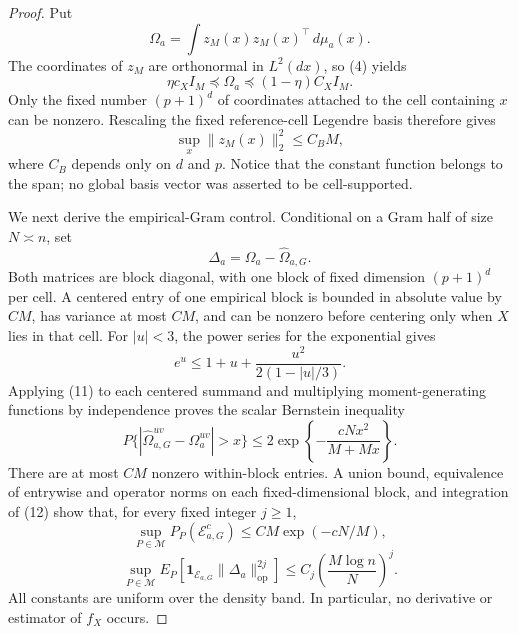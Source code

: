 \documentclass{article}
\begin{document}
\begin{proof}
Put
\[
 \Omega_a=\int z_M(x)z_M(x)^\top\,d\mu_a(x).
 \tag{8}
\]
The coordinates of \(z_M\) are orthonormal in \(L^2(dx)\), so (4) yields
\[
 \eta c_X I_M\preceq\Omega_a
 \preceq(1-\eta)C_XI_M.
 \tag{9}
\]
Only the fixed number \((p+1)^d\) of coordinates attached to the cell containing \(x\) can be nonzero.  Rescaling the fixed reference-cell Legendre basis therefore gives
\[
 \sup_x\|z_M(x)\|_2^2\leq C_BM,
 \tag{10}
\]
where \(C_B\) depends only on \(d\) and \(p\).  Notice that the constant function belongs to the span; no global basis vector was asserted to be cell-supported.

We next derive the empirical-Gram control.  Conditional on a Gram half of size \(N\asymp n\), set
\[
 \Delta_a=\Omega_a-\widehat\Omega_{a,G}.
\]
Both matrices are block diagonal, with one block of fixed dimension \((p+1)^d\) per cell.  A centered entry of one empirical block is bounded in absolute value by \(CM\), has variance at most \(CM\), and can be nonzero before centering only when \(X\) lies in that cell.  For \(|u|<3\), the power series for the exponential gives
\[
 e^u\leq1+u+\frac{u^2}{2(1-|u|/3)}.
 \tag{11}
\]
Applying (11) to each centered summand and multiplying moment-generating functions by independence proves the scalar Bernstein inequality
\[
 P\{|\widehat\Omega_{a,G}^{uv}-\Omega_a^{uv}|>x\}
 \leq2\exp\left\{-\frac{cNx^2}{M+Mx}\right\}.
 \tag{12}
\]
There are at most \(CM\) nonzero within-block entries.  A union bound, equivalence of entrywise and operator norms on each fixed-dimensional block, and integration of (12) show that, for every fixed integer \(j\geq1\),
\[
 \sup_{P\in\mathcal M}P_P(\mathcal E_{a,G}^c)
 \leq CM\exp(-cN/M),
 \tag{13}
\]
\[
 \sup_{P\in\mathcal M}
 E_P\!\left[
  \mathbf 1_{\mathcal E_{a,G}}
  \|\Delta_a\|_{\mathrm{op}}^{2j}
 \right]
 \leq C_j\left(\frac{M\log n}{N}\right)^j.
 \tag{14}
\]
All constants are uniform over the density band.  In particular, no derivative or estimator of \(f_X\) occurs.


\end{proof}
\end{document}
